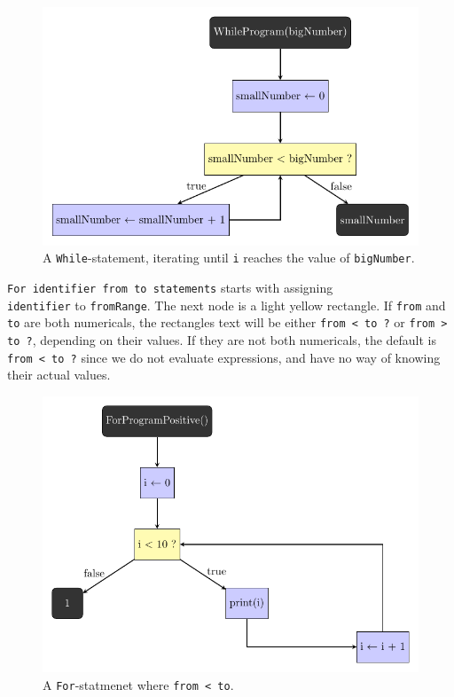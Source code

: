 \begin{figure}[ht]
    \centering
    \includegraphics[scale=.75]{assets/chapter4/WhileProgram_ibp.pdf}
    \caption{A \texttt{While}-statement, iterating until \texttt{i} reaches the value of \texttt{bigNumber}.}
    \label{flochartWhile}
\end{figure}

\texttt{For identifier from to statements} starts with assigning \\ \texttt{identifier} to \texttt{fromRange}. The next node is a light yellow rectangle. If \texttt{from} and \texttt{to} are both numericals, the rectangles text will be either \texttt{from < to ?} or \texttt{from > to ?}, depending on their values. If they are not both numericals, the default is \texttt{from < to ?} since we do not evaluate expressions, and have no way of knowing their actual values. \\

\begin{figure}[ht!]
    \centering
    \includegraphics[scale=.58]{assets/chapter4/ForProgramPositive_ibp.pdf}
    \caption{A \texttt{For}-statmenet where \texttt{from < to}.}
    \label{forExample1}
\end{figure}

